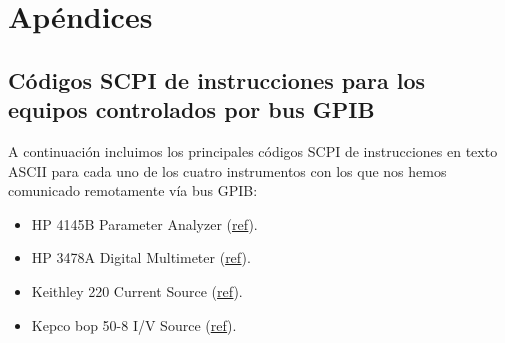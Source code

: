 \cleardoublepage
{}
{}

\chapter*{Apéndices}



\section{Códigos SCPI de instrucciones para los equipos controlados por bus GPIB}
\label{cap:codigos_scpi_equipos_bus_gpib}

A continuación incluimos los principales códigos SCPI de instrucciones en texto ASCII para cada uno de los cuatro instrumentos con los que nos hemos comunicado remotamente vía bus GPIB:

\begin{itemize}

\item HP 4145B Parameter Analyzer (\hyperlink{codesHP4145B.1}{ref}).
\item HP 3478A Digital Multimeter (\hyperlink{codesHP3478A.1}{ref}).
\item Keithley 220 Current Source (\hyperlink{codesKTH220.1}{ref}).
\item Kepco bop 50-8 I/V Source (\hyperlink{codesKEPCO508.1}{ref}).

\end{itemize}





